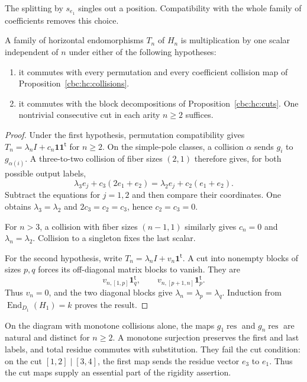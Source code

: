 The splitting by $s_{e_1}$ singles out a position.
Compatibility with the whole family of coefficients
removes this choice.

\begin{proposition}\label{cbc:va:natural-scalars}
A family of horizontal endomorphisms $T_n$ of $H_n$
is multiplication by one scalar independent of $n$
under either of the following hypotheses:
\begin{enumerate}
 \item it commutes with every permutation and every
       coefficient collision map of
       Proposition~\ref{cbc:hc:collisions}.
 \item it commutes with the block decompositions of
       Proposition~\ref{cbc:hc:cuts}. One nontrivial
       consecutive cut in each arity $n\geq2$ suffices.
\end{enumerate}
\end{proposition}
\begin{proof}
Under the first hypothesis, permutation compatibility
gives $T_n=\lambda_nI+c_n\mathbf1\mathbf1^{\mathsf t}$
for $n\geq2$. On the simple-pole classes, a collision
$\alpha$ sends $g_i$ to $g_{\alpha(i)}$.
A three-to-two collision of fiber sizes $(2,1)$ therefore
gives, for both possible output labels,
\[
 \lambda_3e_j+c_3(2e_1+e_2)
       =\lambda_2e_j+c_2(e_1+e_2).
\]
Subtract the equations for $j=1,2$ and then compare
their coordinates. One obtains
$\lambda_3=\lambda_2$ and $2c_3=c_2=c_3$, hence
$c_2=c_3=0$.

For $n>3$, a collision with fiber sizes
$(n-1,1)$ similarly gives $c_n=0$ and
$\lambda_n=\lambda_2$. Collision to a singleton fixes
the last scalar.

For the second hypothesis, write
$T_n=\lambda_nI+v_n\mathbf1^{\mathsf t}$.
A cut into nonempty blocks of sizes $p,q$ forces its
off-diagonal matrix blocks to vanish. They are
\[
 v_{n,[1,p]}\mathbf1_q^{\mathsf t},
 \qquad v_{n,[p+1,n]}\mathbf1_p^{\mathsf t}.
\]
Thus $v_n=0$, and the two diagonal blocks give
$\lambda_n=\lambda_p=\lambda_q$. Induction from
$\operatorname{End}_{D_1}(H_1)=k$ proves the result.
\end{proof}

On the diagram with monotone collisions alone, the maps
$g_1\operatorname{res}$ and $g_n\operatorname{res}$ are
natural and distinct for $n\geq2$. A monotone surjection
preserves the first and last labels, and total residue
commutes with substitution. They fail the cut condition:
on the cut $[1,2]\mid[3,4]$, the first map sends the
residue vector $e_3$ to $e_1$. Thus the cut maps supply
an essential part of the rigidity assertion.


